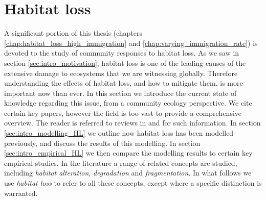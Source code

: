 
%
%
%


\section{Habitat loss}
\label{sec:intro_habitat_loss}

A significant portion of this thesis (chapters \ref{chap:habitat_loss_high_immigration} and \ref{chap:varying_immigration_rate}) is devoted to the study of community responses to habitat loss. As we saw in section \ref{sec:intro_motivation}, habitat loss is one of the leading causes of the extensive damage to ecosystems that we are witnessing globally. Therefore understanding the effects of habitat loss, and how to mitigate them, is more important now than ever. In this section we introduce the current state of knowledge regarding this issue, from a community ecology perspective. We cite certain key papers, however the field is too vast to provide a comprehensive overview. The reader is referred to reviews in \cite{hagen2012biodiversity} and \cite{gonzalez2011disentangled} for such information. In section \ref{sec:intro_modelling_HL} we outline how habitat loss has been modelled previously, and discuss the results of this modelling. In section \ref{sec:intro_empirical_HL} we then compare the modelling results to certain key empirical studies. In the literature a range of related concepts are studied, including \emph{habitat alteration}, \emph{degradation} and \emph{fragmentation}. In what follows we use \emph{habitat loss} to refer to all these concepts, except where a specific distinction is warranted.

